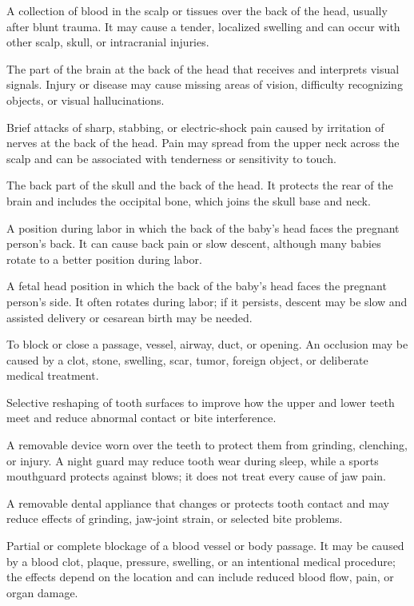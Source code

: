  A collection of blood in the scalp or tissues over the
back of the head, usually after blunt trauma. It may cause a tender, localized
swelling and can occur with other scalp, skull, or intracranial injuries.

 The part of the brain at the back of the head that receives and interprets visual signals. Injury or disease may cause missing areas of vision, difficulty recognizing objects, or visual hallucinations.

 Brief attacks of sharp, stabbing, or electric-shock pain caused by irritation of nerves at the back of the head. Pain may spread from the upper neck across the scalp and can be associated with tenderness or sensitivity to touch.

 The back part of the skull and the back of the head. It protects the rear of the brain and includes the occipital bone, which joins the skull base and neck.

 A position during labor in which the back of the baby’s head faces the pregnant person’s back. It can cause back pain or slow descent, although many babies rotate to a better position during labor.

 A fetal head position in which the back of the baby’s head faces the pregnant person’s side. It often rotates during labor; if it persists, descent may be slow and assisted delivery or cesarean birth may be needed.

 To block or close a passage, vessel, airway, duct, or opening. An occlusion may be caused by a clot, stone, swelling, scar, tumor, foreign object, or deliberate medical treatment.

 Selective reshaping of tooth surfaces to improve how the upper and lower teeth meet and reduce abnormal contact or bite interference.

 A removable device worn over the teeth to protect them from grinding, clenching, or injury. A night guard may reduce tooth wear during sleep, while a sports mouthguard protects against blows; it does not treat every cause of jaw pain.

 A removable dental appliance that changes or protects tooth contact and may reduce effects of grinding, jaw-joint strain, or selected bite problems.

 Partial or complete blockage of a blood vessel or body passage. It may be caused by a blood clot, plaque, pressure, swelling, or an intentional medical procedure; the effects depend on the location and can include reduced blood flow, pain, or organ damage.

